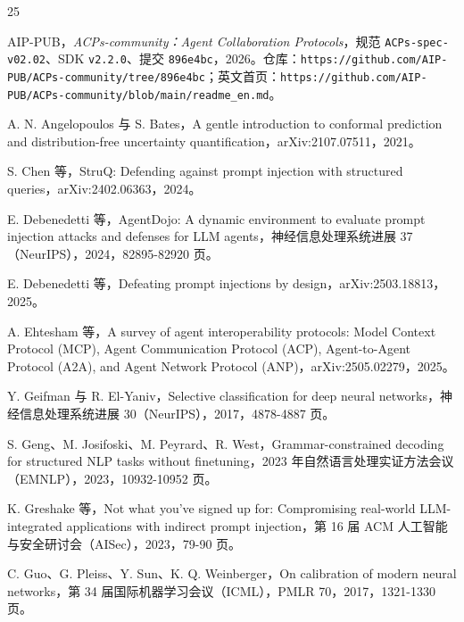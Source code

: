 \documentclass[11pt,a4paper]{article}
\begin{document}
\begin{thebibliography}{25}

 AIP-PUB，\emph{ACPs-community：Agent Collaboration Protocols}，规范 \texttt{ACPs-spe\allowbreak{}c-v02.02}、SDK \texttt{v2.2.0}、提交 \texttt{896e4bc}，2026。仓库：\texttt{https:/\allowbreak{}/\allowbreak{}github.com/\allowbreak{}AIP-PUB/\allowbreak{}ACPs-community/\allowbreak{}tree/\allowbreak{}896e4bc}；英文首页：\texttt{https:/\allowbreak{}/\allowbreak{}github.com/\allowbreak{}AIP-PUB/\allowbreak{}ACPs-community/\allowbreak{}blob/\allowbreak{}main/\allowbreak{}readme\_\allowbreak{}en.md}。

 A. N. Angelopoulos 与 S. Bates，A gentle introduction to conformal prediction and distribution-free uncertainty quantification，arXiv:2107.07511，2021。

 S. Chen 等，StruQ: Defending against prompt injection with structured queries，arXiv:2402.06363，2024。

 E. Debenedetti 等，AgentDojo: A dynamic environment to evaluate prompt injection attacks and defenses for LLM agents，神经信息处理系统进展 37（NeurIPS），2024，82895-82920 页。

 E. Debenedetti 等，Defeating prompt injections by design，arXiv:2503.18813，2025。

 A. Ehtesham 等，A survey of agent interoperability protocols: Model Context Protocol (MCP), Agent Communication Protocol (ACP), Agent-to-Agent Protocol (A2A), and Agent Network Protocol (ANP)，arXiv:2505.02279，2025。

 Y. Geifman 与 R. El-Yaniv，Selective classification for deep neural networks，神经信息处理系统进展 30（NeurIPS），2017，4878-4887 页。

 S. Geng、M. Josifoski、M. Peyrard、R. West，Grammar-constrained decoding for structured NLP tasks without finetuning，2023 年自然语言处理实证方法会议（EMNLP），2023，10932-10952 页。

 K. Greshake 等，Not what you've signed up for: Compromising real-world LLM-integrated applications with indirect prompt injection，第 16 届 ACM 人工智能与安全研讨会（AISec），2023，79-90 页。

 C. Guo、G. Pleiss、Y. Sun、K. Q. Weinberger，On calibration of modern neural networks，第 34 届国际机器学习会议（ICML），PMLR 70，2017，1321-1330 页。


\end{thebibliography}
\end{document}
